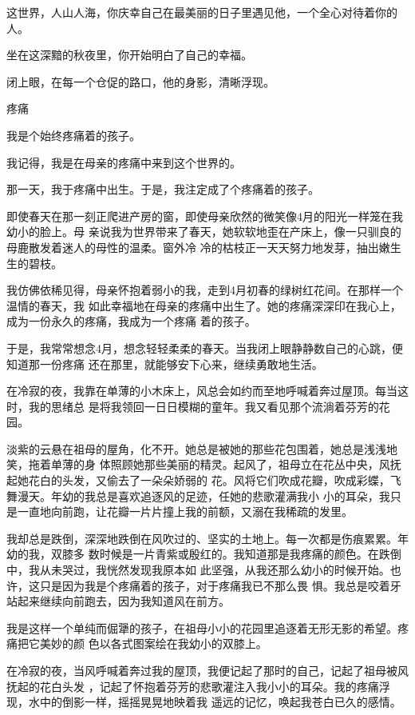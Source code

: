 \documentclass[12pt,a4paper]{article}
\newcommand{\subpart}[1]{
	\begingroup \par
	\vspace{1ex} \centering #1
	\par \endgroup \nopagebreak[4]
}
\begin{document}
		这世界，人山人海，你庆幸自己在最美丽的日子里遇见他，一个全心对待着你的人。

		坐在这深黯的秋夜里，你开始明白了自己的幸福。

		闭上眼，在每一个仓促的路口，他的身影，清晰浮现。

	\endwriting



		\subpart{疼痛}
		我是个始终疼痛着的孩子。

		我记得，我是在母亲的疼痛中来到这个世界的。

		那一天，我于疼痛中出生。于是，我注定成了个疼痛着的孩子。

		即使春天在那一刻正爬进产房的窗，即使母亲欣然的微笑像4月的阳光一样笼在我幼小的脸上。母
	亲说我为世界带来了春天，她软软地歪在产床上，像一只驯良的母鹿散发着迷人的母性的温柔。窗外冷
	冷的枯枝正一天天努力地发芽，抽出嫩生生的碧枝。

		我仿佛依稀见得，母亲怀抱着弱小的我，走到4月初春的绿树红花间。在那样一个温情的春天，我
	如此幸福地在母亲的疼痛中出生了。她的疼痛深深印在我心上，成为一份永久的疼痛，我成为一个疼痛
	着的孩子。

		于是，我常常想念4月，想念轻轻柔柔的春天。当我闭上眼静静数自己的心跳，便知道那一份疼痛
	还在那里，就能够安下心来，继续勇敢地生活。

		在冷寂的夜，我靠在单薄的小木床上，风总会如约而至地呼喊着奔过屋顶。每当这时，我的思绪总
	是将我领回一日日模糊的童年。我又看见那个流淌着芬芳的花园。

		淡紫的云悬在祖母的屋角，化不开。她总是被她的那些花包围着，她总是浅浅地笑，拖着单薄的身
	体照顾她那些美丽的精灵。起风了，祖母立在花丛中央，风抚起她花白的头发，又偷去了一朵朵娇弱的
	花。风将它们吹成花瓣，吹成彩蝶，飞舞漫天。年幼的我总是喜欢追逐风的足迹，任她的悲歌灌满我小
	小的耳朵，我只是一直地向前跑，让花瓣一片片撞上我的前额，又溺在我稀疏的发里。

		我却总是跌倒，深深地跌倒在风吹过的、坚实的土地上。每一次都是伤痕累累。年幼的我，双膝多
	数时候是一片青紫或殷红的。我知道那是我疼痛的颜色。在跌倒中，我从未哭过，我恍然发现我原本如
	此坚强，从我还那么幼小的时候开始。也许，这只是因为我是个疼痛着的孩子，对于疼痛我已不那么畏
	惧。我总是咬着牙站起来继续向前跑去，因为我知道风在前方。

		我是这样一个单纯而倔犟的孩子，在祖母小小的花园里追逐着无形无影的希望。疼痛把它美妙的颜
	色以各式图案绘在我幼小的双膝上。

		在冷寂的夜，当风呼喊着奔过我的屋顶，我便记起了那时的自己，记起了祖母被风抚起的花白头发
	，记起了怀抱着芬芳的悲歌灌注入我小小的耳朵。我的疼痛浮现，水中的倒影一样，摇摇晃晃地映着我
	遥远的记忆，唤起我苍白已久的感情。
\end{document}
